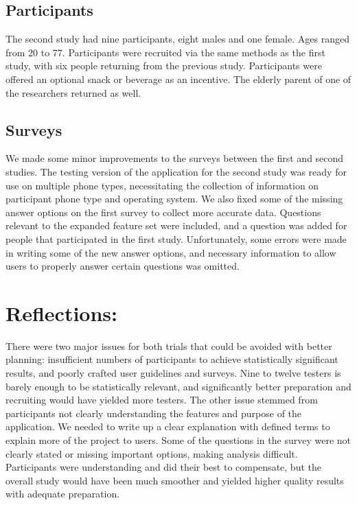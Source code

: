 \documentclass[thesis]{fputhesis}
\begin{document}
\begin{body}
\subsection{Participants}
The second study had nine participants, eight males and one female. Ages ranged from 20
to 77. Participants were recruited via the same methods as the first study, with six people returning from the previous study. Participants were offered an optional snack or beverage
as an incentive. The elderly parent of one of the researchers returned as well. 

\subsection{Surveys} 
We made some minor improvements to the surveys between the first and second studies. The testing version of the application for the second study was ready for use on multiple phone types, necessitating the collection of information on participant phone type and operating system. We also fixed some of the missing answer options on the first survey to collect more accurate data. Questions relevant to the expanded feature set were included, and a question was added for people that participated in the first study. Unfortunately, some errors were made in writing some of the new answer options, and necessary information to allow users to properly answer certain questions was omitted.

\section{Reflections:}
There were two major issues for both trials that could be avoided with better planning: insufficient numbers of participants to achieve statistically significant results, and poorly crafted user guidelines and surveys. Nine to twelve testers is barely enough to be statistically  relevant, and significantly better preparation and recruiting would have yielded more testers. 
The other issue stemmed from participants not clearly understanding the features and purpose of the application. We needed to write up a clear explanation with defined terms to explain more of the project to users. Some of the questions in the survey were not clearly stated or missing important options, making analysis difficult. 
Participants were understanding and did their best to compensate, but the overall study would have been much smoother and yielded higher quality results with adequate preparation.


\end{body}
\end{document}
